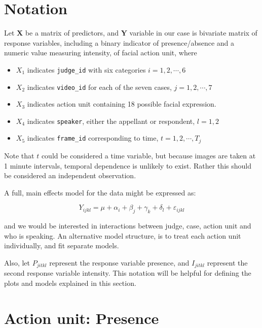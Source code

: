 \documentclass{monashthesis}
\begin{document}
\hypertarget{notation}{%
\section{Notation}\label{notation}}

Let \(\mathbf{X}\) be a matrix of predictors, and \(\mathbf{Y}\) variable in our case is bivariate matrix of response variables, including a binary indicator of presence/absence and a numeric value measuring intensity, of facial action unit, where

\begin{itemize}
\tightlist
\item
  \(X_1\) indicates \texttt{judge\_id} with six categories \(i = 1,2, \cdots, 6\)
\item
  \(X_2\) indicates \texttt{video\_id} for each of the seven cases, \(j = 1,2, \cdots, 7\)
\item
  \(X_3\) indicates action unit containing 18 possible facial expression.\\
\item
  \(X_4\) indicates \texttt{speaker}, either the appellant or respondent, \(l=1,2\)
\item
  \(X_5\) indicates \texttt{frame\_id} corresponding to time, \(t = 1,2, \cdots, T_j\)
\end{itemize}

Note that \(t\) could be considered a time variable, but because images are taken at 1 minute intervals, temporal dependence is unlikely to exist. Rather this should be considered an independent observation.

A full, main effects model for the data might be expressed as:

\[Y_{ijkl} = \mu + \alpha_i + \beta_j + \gamma_k + \delta_l + \varepsilon_{ijkl}\]

\noindent and we would be interested in interactions between judge, case, action unit and who is speaking. An alternative model structure, is to treat each action unit individually, and fit separate models.

Also, let \(P_{jitkl}\) represent the response variable presence, and \(I_{jitkl}\) represent the second response variable intensity. This notation will be helpful for defining the plots and models explained in this section.

\hypertarget{action-unit-presence}{%
\section{Action unit: Presence}\label{action-unit-presence}}
\end{document}
